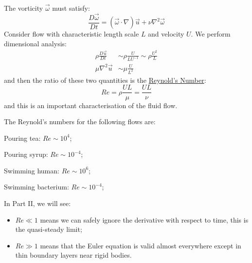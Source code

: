 \documentclass[../Main.tex]{subfiles}
\begin{document}
The vorticity $\vec{\omega}$ must satisfy:
\begin{equation*}
    \frac{D \vec{\omega}}{D t} = (\vec{\omega} \cdot \nabla)\vec{u} + \nu \nabla^2 \vec{\omega}
\end{equation*}
Consider flow with characteristic length scale $L$ and velocity $U$. We perform dimensional analysis:
\begin{align*}
    \rho \frac{D \vec{u}}{D t} &\sim \rho \frac{U}{LU^{-1}} \sim \rho \frac{U^2}{L} \\
    \mu \nabla^2 \vec{u} &\sim \mu \frac{U}{L^2}
\end{align*}
and then the ratio of these two quantities is the \underline{Reynold's Number}:
\begin{equation*}
    Re = \rho \frac{UL}{\mu} = \frac{UL}{\nu}
\end{equation*}
and this is an important characterisation of the fluid flow.
\begin{examples}{
        The Reynold's numbers for the following flows are:
    }
    \item Pouring tea: $Re \sim 10^4$;
    \item Pouring syrup: $Re \sim 10^{-4}$;
    \item Swimming human: $Re \sim 10^6$;
    \item Swimming bacterium: $Re \sim 10^{-4}$;
\end{examples}
In Part II, we will see:
\begin{itemize}
    \item $Re \ll 1$ means we can safely ignore the derivative with respect to time, this is the quasi-steady limit;
    \item $Re \gg 1$ means that the Euler equation is valid almost everywhere except in thin boundary layers near rigid bodies.
\end{itemize}
\end{document}
